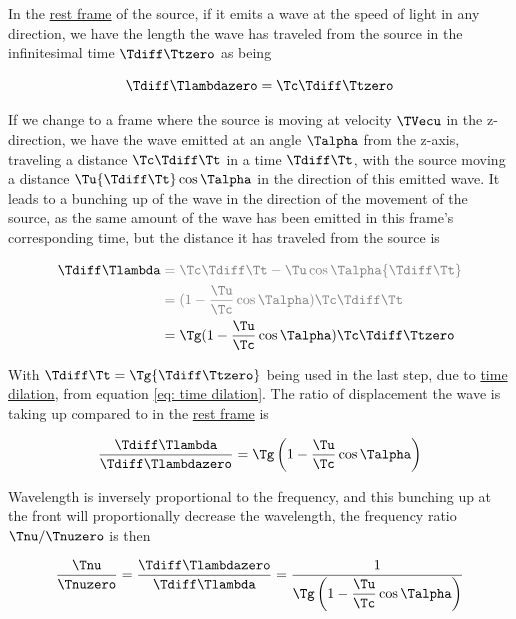 In the \hyperlink{def-proper-frame}{rest frame} of the source, if it emits a wave at the speed of light in any direction, we have the length the wave has traveled from the source in the infinitesimal time ${\Tdiff \Ttzero }$ as being

\begin{equation}
	{\Tdiff \Tlambdazero } = {\Tc }{\Tdiff \Ttzero }
\end{equation}

If we change to a frame where the source is moving at velocity ${\TVecu  }$ in the z-direction, we have the wave emitted at an angle $\Talpha $ from the z-axis, traveling a distance ${\Tc }{\Tdiff \Tt }$ in a time ${\Tdiff \Tt }$, with the source moving a distance $ \Tu  {\Tdiff \Tt } \cos\Talpha  $ in the direction of this emitted wave.
It leads to a bunching up of the wave in the direction of the movement of the source, as the same amount of the wave has been emitted in this frame's corresponding time, but the distance it has traveled from the source is

\begin{equation}
	\begin{aligned}
		{\Tdiff \Tlambda } & \color{gray}= {\Tc }{\Tdiff \Tt }-{\Tu } \cos\Talpha  {\Tdiff \Tt }   \\
		           & \color{gray}=  (1-\frac{\Tu }{\Tc }\cos\Talpha )\Tc \Tdiff \Tt  \\
		           & = \Tg  (1-\frac{\Tu }{\Tc }\cos\Talpha )\Tc \Tdiff \Ttzero    \\
	\end{aligned}
\end{equation}

With ${\Tdiff \Tt } = \Tg  {\Tdiff \Ttzero }$ being used in the last step, due to \hyperlink{def-time-dilation}{time dilation}, from equation \eqref{eq: time dilation}.
The ratio of displacement the wave is taking up compared to in the \hyperlink{def-proper-frame}{rest frame} is

\begin{equation}
	\frac{\Tdiff \Tlambda }{\Tdiff \Tlambdazero } = \Tg  \left(1-\dfrac{\Tu }{\Tc } \cos\Talpha  \right)
\end{equation}

Wavelength is inversely proportional to the frequency, and this bunching up at the front will proportionally decrease the wavelength, the frequency ratio $\Tnu /\Tnuzero $ is then

\begin{equation}
	\label{eq: Doppler Effect}
	\frac{\Tnu }{\Tnuzero } = \frac{\Tdiff \Tlambdazero }{\Tdiff \Tlambda } = \frac{1}{ \Tg  \left(1-\dfrac{\Tu }{\Tc } \cos\Talpha  \right)}
\end{equation}

